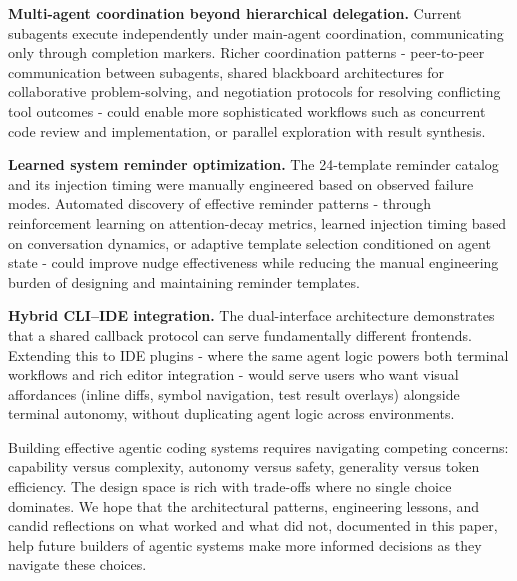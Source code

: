 \begin{packeditemize}
\item \textbf{Multi-agent coordination beyond hierarchical delegation.} Current subagents execute independently under main-agent coordination, communicating only through completion markers. Richer coordination patterns - peer-to-peer communication between subagents, shared blackboard architectures for collaborative problem-solving, and negotiation protocols for resolving conflicting tool outcomes - could enable more sophisticated workflows such as concurrent code review and implementation, or parallel exploration with result synthesis.

\item \textbf{Learned system reminder optimization.} The 24-template reminder catalog and its injection timing were manually engineered based on observed failure modes. Automated discovery of effective reminder patterns - through reinforcement learning on attention-decay metrics, learned injection timing based on conversation dynamics, or adaptive template selection conditioned on agent state - could improve nudge effectiveness while reducing the manual engineering burden of designing and maintaining reminder templates.

\item \textbf{Hybrid CLI--IDE integration.} The dual-interface architecture demonstrates that a shared callback protocol can serve fundamentally different frontends. Extending this to IDE plugins - where the same agent logic powers both terminal workflows and rich editor integration - would serve users who want visual affordances (inline diffs, symbol navigation, test result overlays) alongside terminal autonomy, without duplicating agent logic across environments.
\end{packeditemize}

Building effective agentic coding systems requires navigating competing concerns: capability versus complexity, autonomy versus safety, generality versus token efficiency. The design space is rich with trade-offs where no single choice dominates. We hope that the architectural patterns, engineering lessons, and candid reflections on what worked and what did not, documented in this paper, help future builders of agentic systems make more informed decisions as they navigate these choices.
